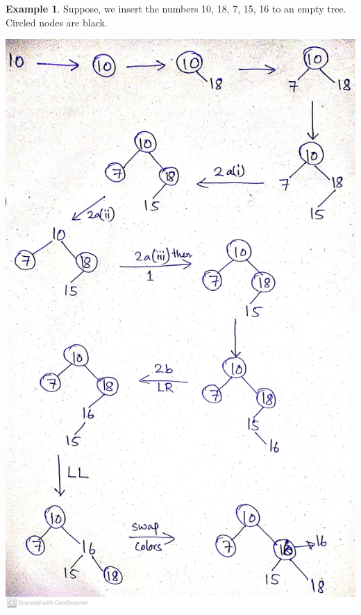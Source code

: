 \documentclass[10pt, a4paper]{extarticle}
\theoremstyle{definition}
\newtheorem{eg}{Example}
\begin{document}
	\begin{eg}
		Suppose, we insert the numbers 10, 18, 7, 15, 16 to an empty tree. Circled nodes are black. 
		\begin{center}
			\includegraphics[scale=0.08]{red-black.jpg}\\
		\end{center}
	\end{eg}
\end{document}
